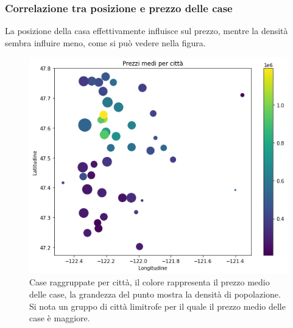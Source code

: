 \documentclass{beamer}
\begin{document}
\begin{frame}
	\frametitle{Correlazione tra posizione e prezzo delle case}
La posizione della casa effettivamente influisce sul prezzo, mentre la densità
sembra influire meno, come si può vedere nella figura.
\begin{figure}[ht]
	\centering
	\includegraphics[scale=0.25]{cities}
	\caption{Case raggruppate per città, il colore rappresenta il prezzo
	medio delle case, la grandezza del punto mostra la densità di popolazione.
	Si nota un gruppo di città limitrofe per il quale il prezzo medio delle
	case è maggiore.}
\end{figure}
\end{frame}
\end{document}
